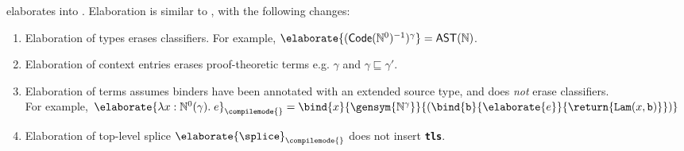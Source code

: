 \recLang{} elaborates into \recCoreLang{}. Elaboration is similar to , with the following changes:
\begin{enumerate}
  \item Elaboration of types erases classifiers. For example,  $\elaborate{(\textsf{Code}(\mathbb{N}^{0})^{-1})^{\gamma}} = \mathbb{\textsf{AST}(\mathbb{N})}$.
  \item Elaboration of context entries erases proof-theoretic terms e.g. $\gamma$ and $\gamma \sqsubseteq \gamma'$.
  \item Elaboration of terms assumes binders have been annotated with an extended source type, and does \textit{not} erase classifiers. \\
  For example, $\elaborate{\lambda x: {\mathbb{N}^0({\gamma})}. \; e}_{\compilemode{}} = \bind{x}{\gensym{\mathbb{N}^{\gamma}}}{(\bind{\texttt{b}}{\elaborate{e}}{\return{\texttt{Lam}(x, \texttt{b})}})}$
  \item Elaboration of top-level splice $\elaborate{\splice}_{\compilemode{}}$ does not insert \textbf{\texttt{tls}}.
\end{enumerate}


